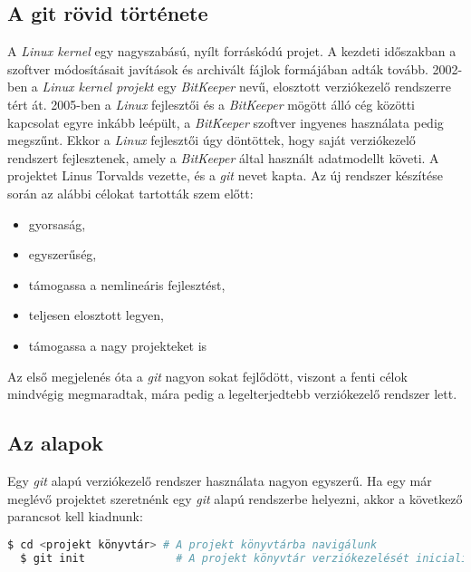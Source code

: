 \subsection{A git rövid története}

A \textit{Linux kernel} egy nagyszabású, nyílt forráskódú projet. A kezdeti
időszakban a szoftver módosításait javítások és archivált fájlok formájában
adták tovább. 2002-ben a \textit{Linux kernel projekt} egy \textit{BitKeeper}
nevű, elosztott verziókezelő rendszerre tért át. 2005-ben a \textit{Linux}
fejlesztői és a \textit{BitKeeper} mögött álló cég közötti kapcsolat egyre
inkább leépült, a \textit{BitKeeper} szoftver ingyenes használata pedig
megszűnt. Ekkor a \textit{Linux} fejlesztői úgy döntöttek, hogy saját
verziókezelő rendszert fejlesztenek, amely a \textit{BitKeeper} által
használt adatmodellt követi. A projektet Linus Torvalds vezette, és a
\textit{git} nevet kapta. Az új rendszer készítése során az alábbi célokat
tartották szem előtt:
\begin{itemize}
	\item gyorsaság,
	\item egyszerűség,
	\item támogassa a nemlineáris fejlesztést,
	\item teljesen elosztott legyen,
	\item támogassa a nagy projekteket is
\end{itemize}
Az első megjelenés óta a \textit{git} nagyon sokat fejlődött, viszont a fenti
célok mindvégig megmaradtak, mára pedig a legelterjedtebb verziókezelő rendszer
lett. \cite{git_scm_1.2}

\subsection{Az alapok}

Egy \textit{git} alapú verziókezelő rendszer használata nagyon egyszerű.
Ha egy már meglévő projektet szeretnénk egy \textit{git} alapú rendszerbe
helyezni, akkor a következő parancsot kell kiadnunk:

\begin{lstlisting}[caption={A git inicializálása},language=sh]
  $ cd <projekt könyvtár> # A projekt könyvtárba navigálunk
  $ git init              # A projekt könyvtár verziókezelését inicializáljuk
\end{lstlisting}


